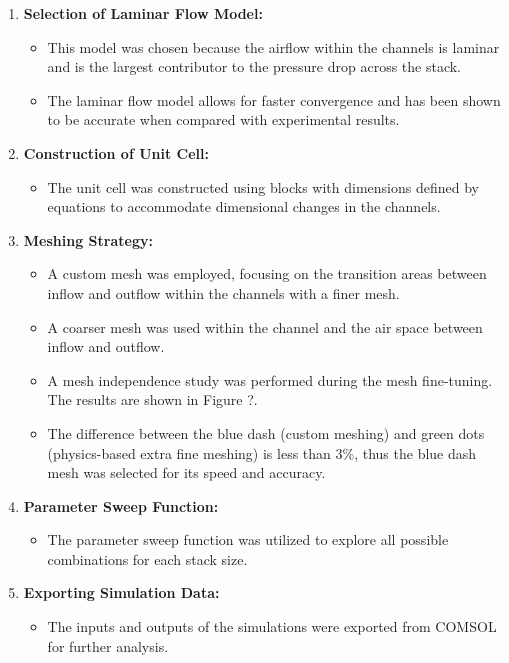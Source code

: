 \documentclass{report}
\begin{document}
        \begin{enumerate}
            \item \textbf{Selection of Laminar Flow Model:}
            \begin{itemize}
                \item This model was chosen because the airflow within the channels is laminar and is the largest contributor to the pressure drop across the stack.
                \item The laminar flow model allows for faster convergence and has been shown to be accurate when compared with experimental results.
            \end{itemize}
            
            \item \textbf{Construction of Unit Cell:}
            \begin{itemize}
                \item The unit cell was constructed using blocks with dimensions defined by equations to accommodate dimensional changes in the channels.
            \end{itemize}
            
            \item \textbf{Meshing Strategy:}
            \begin{itemize}
                \item A custom mesh was employed, focusing on the transition areas between inflow and outflow within the channels with a finer mesh.
                \item A coarser mesh was used within the channel and the air space between inflow and outflow.
                \item A mesh independence study was performed during the mesh fine-tuning. The results are shown in Figure ?.
                \item The difference between the blue dash (custom meshing) and green dots (physics-based extra fine meshing) is less than 3\%, thus the blue dash mesh was selected for its speed and accuracy.
            \end{itemize}
            
            \item \textbf{Parameter Sweep Function:}
            \begin{itemize}
                \item The parameter sweep function was utilized to explore all possible combinations for each stack size.
            \end{itemize}
            
            \item \textbf{Exporting Simulation Data:}
            \begin{itemize}
                \item The inputs and outputs of the simulations were exported from COMSOL for further analysis.
            \end{itemize}
        \end{enumerate}
\end{document}
